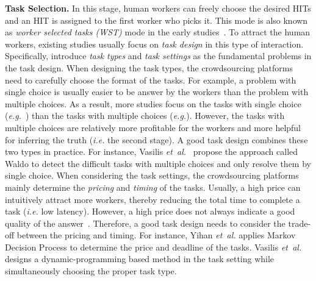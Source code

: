 \documentclass[11pt]{article}
\newcommand{\etal}{\textit{et~al.}\xspace}
\newcommand{\eg}{\textit{e.g.}\xspace}
\newcommand{\ie}{\textit{i.e.}\xspace}
\newcommand{\fakeparagraph}[1]{\vspace{1mm}\noindent\textbf{#1.}}
\begin{document}
\fakeparagraph{Task Selection}
In this stage, human workers can freely choose the desired HITs and an HIT is assigned to the first worker who picks it.
This mode is also known as \textit{worker selected tasks (WST)} mode in the early studies~\cite{DBLP:conf/gis/KazemiS12,DBLP:conf/gis/DengSD13}.
To attract the human workers, existing studies usually focus on \textit{task design} in this type of interaction.
Specifically, \cite{DBLP:journals/tkde/LiWZF16,sigmod17tutorial} introduce \textit{task types} and \textit{task settings} as the fundamental problems in the task design.
When designing the task types, the crowdsourcing platforms need to carefully choose the format of the tasks.
For example, a problem with single choice is usually easier to be answer by the workers than the problem with multiple choices.
As a result, more studies focus on the tasks with single choice (\eg ~\cite{DBLP:journals/pvldb/FirmaniSS16,DBLP:conf/sigmod/WangLKFF13,DBLP:conf/icde/ZengTCZ18}) than the tasks with multiple choices (\eg \cite{DBLP:journals/pvldb/WangKFF12}).
However, the tasks with multiple choices are relatively more profitable for the workers and more helpful for inferring the truth (\ie the second stage).
A good task design combines these two types in practice.
For instance, Vasilis \etal~\cite{DBLP:conf/sigmod/VerroiosGP17} propose the approach called Waldo
to detect the difficult tasks with multiple choices and only resolve them by single choice.
When considering the task settings, the crowdsourcing platforms mainly determine the \textit{pricing} and \textit{timing} of the tasks.
Usually, a high price can intuitively attract more workers, thereby reducing the total time to complete a task (\ie low latency). 
However, a high price does not always indicate a good quality of the answer~\cite{DBLP:conf/aaai/FaradaniHI11}.
Therefore, a good task design needs to consider the trade-off between the pricing and timing.
For instance, Yihan \etal \cite{DBLP:journals/pvldb/GaoP14} applies Markov Decision Process to determine the price and deadline of the tasks.
Vasilis \etal \cite{DBLP:conf/sigmod/VerroiosLG15} designs a dynamic-programming based method in the task setting while simultaneously choosing the proper task type.
\end{document}
